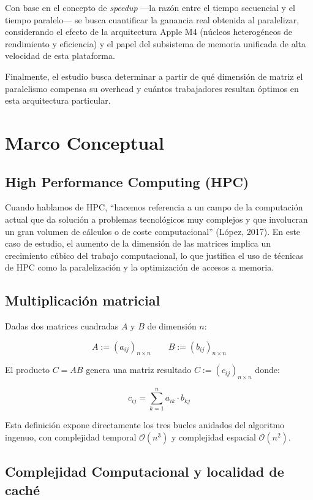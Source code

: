 \documentclass{article}
\begin{document}
Con base en el concepto de \emph{speedup} ---la razón entre el tiempo secuencial y el tiempo paralelo--- se busca cuantificar la ganancia real obtenida al paralelizar, considerando el efecto de la arquitectura Apple M4 (núcleos heterogéneos de rendimiento y eficiencia) y el papel del subsistema de memoria unificada de alta velocidad de esta plataforma.

Finalmente, el estudio busca determinar a partir de qué dimensión de matriz el paralelismo compensa su overhead y cuántos trabajadores resultan óptimos en esta arquitectura particular.

\section{Marco Conceptual}

\subsection{High Performance Computing (HPC)}

Cuando hablamos de HPC, ``hacemos referencia a un campo de la computación actual que da solución a problemas tecnológicos muy complejos y que involucran un gran volumen de cálculos o de coste computacional'' (López, 2017). En este caso de estudio, el aumento de la dimensión de las matrices implica un crecimiento cúbico del trabajo computacional, lo que justifica el uso de técnicas de HPC como la paralelización y la optimización de accesos a memoria.

\subsection{Multiplicación matricial}

Dadas dos matrices cuadradas $A$ y $B$ de dimensión $n$:

\[ A := (a_{ij})_{n \times n} \qquad B := (b_{ij})_{n \times n} \]

El producto $C = AB$ genera una matriz resultado $C := (c_{ij})_{n \times n}$ donde:

\[ c_{ij} = \sum_{k=1}^{n} a_{ik} \cdot b_{kj} \]

Esta definición expone directamente los tres bucles anidados del algoritmo ingenuo, con complejidad temporal $\mathcal{O}(n^3)$ y complejidad espacial $\mathcal{O}(n^2)$.

\subsection{Complejidad Computacional y localidad de caché}
\end{document}
